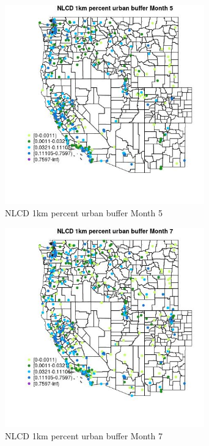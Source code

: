 \begin{figure} 
\centering  
\includegraphics[width=0.77\textwidth]{Code_Outputs/Report_ML_input_PM25_Step4_part_e_de_duplicated_aves_compiled_2019-05-18wNAs_MapObsMo5NLCD_1km_percent_urban_buffer.jpg} 
\caption{\label{fig:Report_ML_input_PM25_Step4_part_e_de_duplicated_aves_compiled_2019-05-18wNAsMapObsMo5NLCD_1km_percent_urban_buffer}NLCD 1km percent urban buffer Month 5} 
\end{figure} 
 

\begin{figure} 
\centering  
\includegraphics[width=0.77\textwidth]{Code_Outputs/Report_ML_input_PM25_Step4_part_e_de_duplicated_aves_compiled_2019-05-18wNAs_MapObsMo7NLCD_1km_percent_urban_buffer.jpg} 
\caption{\label{fig:Report_ML_input_PM25_Step4_part_e_de_duplicated_aves_compiled_2019-05-18wNAsMapObsMo7NLCD_1km_percent_urban_buffer}NLCD 1km percent urban buffer Month 7} 
\end{figure} 
 

